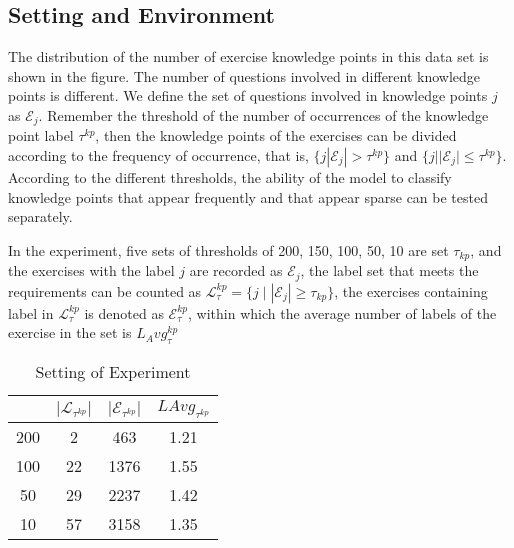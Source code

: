 \subsection{Setting and Environment}
The distribution of the number of exercise knowledge points in this data set is shown in the figure. The number of questions involved in different knowledge points is different. We define the set of questions involved in knowledge points \(j\) as \(\mathcal{E}_j\). Remember the threshold of the number of occurrences of the knowledge point label \(\tau^{kp} \), then the knowledge points of the exercises can be divided according to the frequency of occurrence, that is, \( \{j|\mathcal{E}_j|>\tau^{kp}\} \) and \( \{j||\mathcal{E}_j|\leq\tau^{kp} \} \). According to the different thresholds, the ability of the model to classify knowledge points that appear frequently and that appear sparse can be tested separately.

In the experiment, five sets of thresholds of 200, 150, 100, 50, 10 are set \(\tau_{kp} \), and the exercises with the label \(j\) are recorded as \(\mathcal{E}_j\), the label set that meets the requirements can be counted as \(\mathcal{L}_\tau^{kp}=\{j\mid |\mathcal{E}_j|\geq\tau_{kp}\} \), the exercises containing label in \(\mathcal{L}_\tau^{kp} \) is denoted as \(\mathcal{E}_\tau^{kp} \), within which the average number of labels of the exercise in the set is \(L_Avg_\tau^{kp}\)

\begin{table}[htbp!]
	\centering
	\caption{Setting of Experiment}\label{tbl:ch2-ex1}
	\begin{tabular}{cccc}%
		\toprule
		\text{\(\tau^{kp} \)} & \(|\mathcal{L}_{\tau^{kp}}|\) & \(|\mathcal{E}_{\tau^{kp}}| \) & \(LAvg_{\tau^{kp}} \) \\
		\midrule
		200                   & 2                             & 463                            & 1.21                  \\
		100                   & 22                            & 1376                           & 1.55                  \\
		50                    & 29                            & 2237                           & 1.42                  \\
		10                    & 57                            & 3158                           & 1.35                  \\
		\bottomrule
	\end{tabular}
\end{table}



